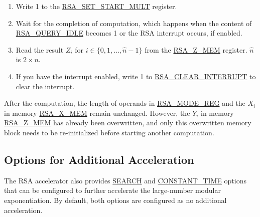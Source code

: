 \documentclass[main\_\_EN.tex]{subfiles}
\begin{document}
\begin{enumerate}
        Users need to write data to each memory block only according to the length of the number; data beyond this length is ignored.

    \item Write 1 to the \hyperref[fielddesc:RSASETSTARTMULT]{RSA\_SET\_START\_MULT} register.

    \item Wait for the completion of computation, which happens when the content of \hyperref[fielddesc:RSAQUERYIDLE]{RSA\_QUERY\_IDLE} becomes 1 or the RSA interrupt occurs, if enabled.

    \item Read the result \begin{math}Z_{i}\end{math}
          for \begin{math}i \in \{ 0, 1, \dots, \hat{n}-1 \} \end{math} from the \hyperref[regdesc:RSAmemory]{RSA\_Z\_MEM} register.
        \begin{math}\hat{n}\end{math} is \begin{math} 2 \times n \end{math}.

    \item If you have the interrupt enabled, write 1 to \hyperref[fielddesc:RSACLEARINTERRUPT]{RSA\_CLEAR\_INTERRUPT} to clear the interrupt.

\end{enumerate}

After the computation, the length of operands in \hyperref[regdesc:RSAMODEREG]{RSA\_MODE\_REG} and the \begin{math}X_{i}\end{math} in memory \hyperref[regdesc:RSAmemory]{RSA\_X\_MEM} remain unchanged. However, the \begin{math}{Y}_{i}\end{math} in memory \hyperref[regdesc:RSAmemory]{RSA\_Z\_MEM} has already been overwritten, and only this overwritten memory block needs to be re-initialized before starting another computation.
\subsection{Options for Additional Acceleration} \label{sec:Accelerate options}
The \chipname{} RSA accelerator also provides \hyperref[regdesc:RSASEARCHENABLEREG]{SEARCH} and \hyperref[regdesc:RSACONSTANTTIMEREG]{CONSTANT\_TIME} options that can be configured to further accelerate the large-number modular exponentiation. By default, both options are configured as no additional acceleration.
\end{document}
